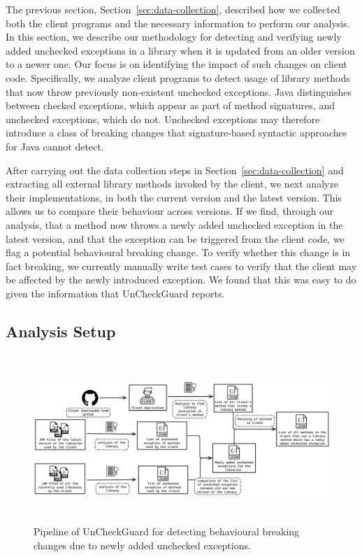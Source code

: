 The previous section, Section~\ref{sec:data-collection}, described how we collected both the client programs and the necessary information to perform our analysis.
In this section, we describe our methodology for detecting and verifying newly added unchecked exceptions in a library when it is updated from an older version to a newer one. Our focus is on identifying the impact of such changes on client code. Specifically, we analyze client programs to detect usage of library methods that now throw previously non-existent unchecked exceptions. Java distinguishes between checked exceptions, which appear as part of method signatures, and unchecked exceptions, which do not. Unchecked exceptions may therefore introduce a class of breaking changes that signature-based syntactic approaches for Java cannot detect.

After carrying out the data collection steps in Section~\ref{sec:data-collection} and extracting all external library methods invoked by the client, we next analyze their implementations, in both the current version and the latest version. This allows us to compare their behaviour across versions. If we find, through our analysis, that a method now throws a newly added unchecked exception in the latest version, and that the exception can be triggered from the client code, we flag a potential behavioural breaking change. To verify whether this change is in fact breaking, we currently manually write test cases to verify that the client may be affected by the newly introduced exception. We found that this was easy to do given the information that UnCheckGuard reports.

\subsection{Analysis Setup}

\begin{figure}[hbt!]
    \centering
    \includegraphics[height=180pt]{diagram/pipeline.png}
    \caption{Pipeline of UnCheckGuard for detecting behavioural breaking changes due to newly added unchecked exceptions.}
    \label{fig:jsonjava}
\end{figure}

